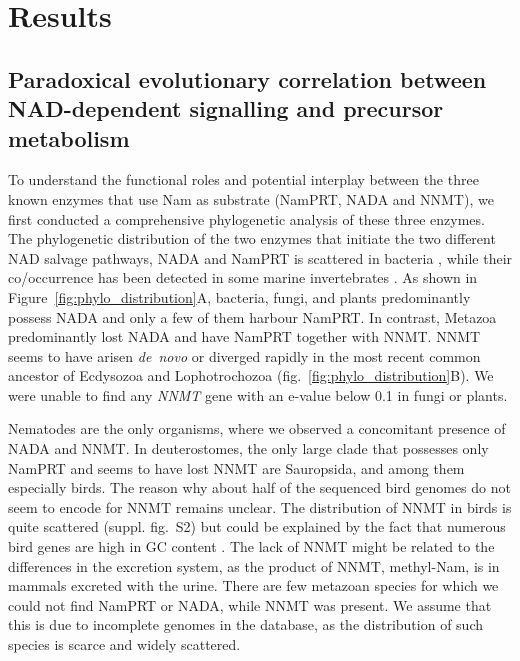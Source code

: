
\section{Results}

\subsection{Paradoxical evolutionary correlation between NAD-dependent signalling and precursor metabolism}


To understand the functional roles and potential interplay between the three known enzymes that use Nam as substrate (NamPRT, NADA and NNMT), we first conducted a comprehensive phylogenetic analysis of these three enzymes. The phylogenetic distribution of the two enzymes that initiate the two different NAD salvage pathways, NADA and NamPRT is scattered in bacteria \citep{Gazzaniga2009}, while their co\-/occurrence has been detected in some marine invertebrates \citep{Gossmann2012FEBS}. As shown in Figure~\ref{fig:phylo_distribution}A, bacteria, fungi, and plants predominantly possess NADA and only a few of them harbour NamPRT. In contrast, Metazoa predominantly lost NADA and have NamPRT together with NNMT. NNMT seems to have arisen \textit{de~novo} or diverged rapidly in the most recent common ancestor of Ecdysozoa and Lophotrochozoa (fig.~\ref{fig:phylo_distribution}B). We were unable to find any \textit{NNMT} gene with an e-value below 0.1 in fungi or plants.

Nematodes are the only organisms, where we observed a concomitant presence of NADA and NNMT. In deuterostomes, the only large clade that possesses only NamPRT and seems to have lost NNMT are Sauropsida, and among them especially birds. The reason why about half of the sequenced bird genomes do not seem to encode for NNMT remains unclear. The distribution of NNMT in birds is quite scattered (suppl. fig.~S2) but could be explained by the fact that numerous bird genes are high in GC content \citep{Hron2015}. The lack of NNMT might be related to the differences in the excretion system, as the product of NNMT, methyl-Nam, is in mammals excreted with the urine. There are few metazoan species for which we could not find NamPRT or NADA, while NNMT was present. We assume that this is due to incomplete genomes in the database, as the distribution of such species is scarce and widely scattered.

